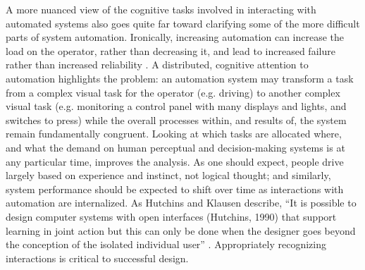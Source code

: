 
A more nuanced view of the cognitive tasks involved in interacting
with automated systems also goes quite far toward clarifying some
of the more difficult parts of system automation. Ironically, increasing
automation can
increase the load on the operator, rather than decreasing it, and
lead to increased failure rather than increased
reliability \cite{parasuramanW}. A distributed,
cognitive attention to automation highlights the problem:  an
automation system may transform a task from a complex visual task for the
operator (e.g. driving) to another complex visual task (e.g. monitoring a control
panel with many displays and lights, and switches to press) while the
overall processes within, and results of, the system remain
fundamentally congruent. Looking at which tasks are
allocated where, and what the demand on human perceptual and
decision-making systems is at any particular time, improves the
analysis. As one should expect, 
people drive largely based on experience and
instinct, \cite{knaptonDriverless} not logical 
thought; and similarly, system performance should be expected to shift
over time as interactions with automation are internalized. As
Hutchins and Klausen describe, ``It is possible to design computer systems with open
interfaces (Hutchins, 1990) that support learning in joint action but
this can only be done when the designer goes beyond the conception of
the isolated individual user'' \cite[p. 13]{hutchinsKlausen}.
Appropriately recognizing interactions is critical to successful design.




